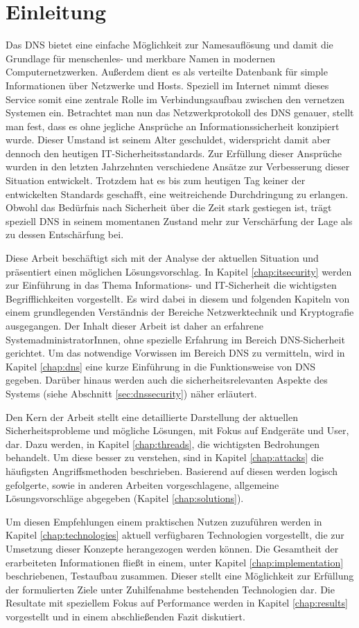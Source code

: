 \chapter{Einleitung}
Das \ac{DNS} bietet eine einfache Möglichkeit zur Namesauflösung und damit die Grundlage für menschenles- und merkbare Namen in modernen Computernetzwerken. Außerdem dient es als verteilte Datenbank für simple Informationen über Netzwerke und Hosts. Speziell im Internet nimmt dieses Service somit eine zentrale Rolle im Verbindungsaufbau zwischen den vernetzen Systemen ein. Betrachtet man nun das Netzwerkprotokoll des DNS genauer, stellt man fest, dass es ohne jegliche Ansprüche an Informationssicherheit konzipiert wurde. Dieser Umstand ist seinem Alter geschuldet, widerspricht damit aber dennoch den heutigen IT-Sicherheitsstandards. Zur Erfüllung dieser Ansprüche wurden in den letzten Jahrzehnten verschiedene Ansätze zur Verbesserung dieser Situation entwickelt. Trotzdem hat es bis zum heutigen Tag keiner der entwickelten Standards geschafft, eine weitreichende Durchdringung zu erlangen. Obwohl das Bedürfnis nach Sicherheit über die Zeit stark gestiegen ist, trägt speziell DNS in seinem momentanen Zustand mehr zur Verschärfung der Lage als zu dessen Entschärfung bei.

Diese Arbeit beschäftigt sich mit der Analyse der aktuellen Situation und präsentiert einen möglichen Lösungsvorschlag. In Kapitel \ref{chap:itsecurity} werden zur Einführung in das Thema Informations- und IT-Sicherheit die wichtigsten Begrifflichkeiten vorgestellt. Es wird dabei in diesem und folgenden Kapiteln von einem grundlegenden Verständnis der Bereiche Netzwerktechnik und Kryptografie ausgegangen. Der Inhalt dieser Arbeit ist daher an erfahrene SystemadministratorInnen, ohne spezielle Erfahrung im Bereich DNS-Sicherheit gerichtet. Um das notwendige Vorwissen im Bereich DNS zu vermitteln, wird in Kapitel \ref{chap:dns} eine kurze Einführung in die Funktionsweise von DNS gegeben. Darüber hinaus werden auch die sicherheitsrelevanten Aspekte des Systems (siehe Abschnitt \ref{sec:dnssecurity}) näher erläutert. 

Den Kern der Arbeit stellt eine detaillierte Darstellung der aktuellen Sicherheitsprobleme und mögliche Lösungen, mit Fokus auf Endgeräte und User, dar. Dazu werden, in Kapitel \ref{chap:threads}, die wichtigsten Bedrohungen behandelt. Um diese besser zu verstehen, sind in Kapitel \ref{chap:attacks} die häufigsten Angriffsmethoden beschrieben. Basierend auf diesen werden logisch gefolgerte, sowie in anderen Arbeiten vorgeschlagene, allgemeine Lösungsvorschläge abgegeben (Kapitel \ref{chap:solutions}). 

Um diesen Empfehlungen einem praktischen Nutzen zuzuführen werden in Kapitel \ref{chap:technologies} aktuell verfügbaren Technologien vorgestellt, die zur Umsetzung dieser Konzepte herangezogen werden können. Die Gesamtheit der erarbeiteten Informationen fließt in einem, unter Kapitel \ref{chap:implementation} beschriebenen, Testaufbau zusammen. Dieser stellt eine Möglichkeit zur Erfüllung der formulierten Ziele unter Zuhilfenahme bestehenden Technologien dar. Die Resultate mit speziellem Fokus auf Performance werden in Kapitel \ref{chap:results} vorgestellt und in einem abschließenden Fazit diskutiert.
